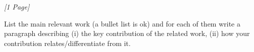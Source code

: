 \textit{[1 Page]}

\noindent
List the main relevant work (a bullet list is ok) and for each of them write a paragraph describing (i) the key contribution of the related work, (ii) how your contribution relates/differentiate from it.
